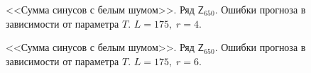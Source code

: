 \documentclass[specialist,
               substylefile = spbu.rtx,
               subf,href,colorlinks=true, 12p]{disser}
\begin{document}
\begin{figure}[H]
	\captionsetup{justification=centering}
	\caption{<<Сумма синусов с белым шумом>>. Ряд $\mathsf{Z}_{650}$. Ошибки прогноза в зависимости от параметра $T$. $L = 175, \; r = 4$.}
\end{figure}

\begin{figure}[H]
	\captionsetup{justification=centering}
	\caption{<<Сумма синусов с белым шумом>>. Ряд $\mathsf{Z}_{650}$. Ошибки прогноза в зависимости от параметра $T$. $L = 175, \; r = 6$.}
\end{figure}
\end{document}
